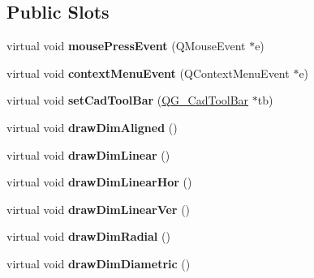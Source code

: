 \subsection*{Public Slots}
\begin{DoxyCompactItemize}
\item 
\hypertarget{classQG__CadToolBarDim_a216df858b9d8658edcd06aa93a228d21}{virtual void {\bfseries mouse\-Press\-Event} (Q\-Mouse\-Event $\ast$e)}\label{classQG__CadToolBarDim_a216df858b9d8658edcd06aa93a228d21}

\item 
\hypertarget{classQG__CadToolBarDim_a818fb2a91a2fb5d5bf98bc46c43d462c}{virtual void {\bfseries context\-Menu\-Event} (Q\-Context\-Menu\-Event $\ast$e)}\label{classQG__CadToolBarDim_a818fb2a91a2fb5d5bf98bc46c43d462c}

\item 
\hypertarget{classQG__CadToolBarDim_ac596b847784e646c7aaaa10fe2927f65}{virtual void {\bfseries set\-Cad\-Tool\-Bar} (\hyperlink{classQG__CadToolBar}{Q\-G\-\_\-\-Cad\-Tool\-Bar} $\ast$tb)}\label{classQG__CadToolBarDim_ac596b847784e646c7aaaa10fe2927f65}

\item 
\hypertarget{classQG__CadToolBarDim_a91fc3e8ea3a89426eed8f3b31465dc4a}{virtual void {\bfseries draw\-Dim\-Aligned} ()}\label{classQG__CadToolBarDim_a91fc3e8ea3a89426eed8f3b31465dc4a}

\item 
\hypertarget{classQG__CadToolBarDim_af1560f1b19d54e80b8bd71d54684bad2}{virtual void {\bfseries draw\-Dim\-Linear} ()}\label{classQG__CadToolBarDim_af1560f1b19d54e80b8bd71d54684bad2}

\item 
\hypertarget{classQG__CadToolBarDim_a3e0ff7b8ae02b7437173958180289a41}{virtual void {\bfseries draw\-Dim\-Linear\-Hor} ()}\label{classQG__CadToolBarDim_a3e0ff7b8ae02b7437173958180289a41}

\item 
\hypertarget{classQG__CadToolBarDim_ab8e1841e2e36b7bbf41a8d82fae34810}{virtual void {\bfseries draw\-Dim\-Linear\-Ver} ()}\label{classQG__CadToolBarDim_ab8e1841e2e36b7bbf41a8d82fae34810}

\item 
\hypertarget{classQG__CadToolBarDim_ad54a83ba3b9fae7f282e3f21e2ce2937}{virtual void {\bfseries draw\-Dim\-Radial} ()}\label{classQG__CadToolBarDim_ad54a83ba3b9fae7f282e3f21e2ce2937}

\item 
\hypertarget{classQG__CadToolBarDim_a3f90daf8f72b17de74aec5246cb98899}{virtual void {\bfseries draw\-Dim\-Diametric} ()}\label{classQG__CadToolBarDim_a3f90daf8f72b17de74aec5246cb98899}


\end{DoxyCompactItemize}
